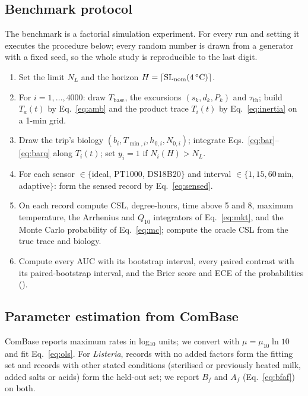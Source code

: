 \subsection{Benchmark protocol}\label{sec:protocol}
The benchmark is a factorial simulation experiment. For every run and setting it executes the procedure below; every random number is drawn from a generator with a fixed seed, so the whole study is reproducible to the last digit.

\begin{tcolorbox}[enhanced,breakable,colback=white,colframe=dgrule,boxrule=0.5pt,arc=0pt,left=5pt,right=5pt,top=3pt,bottom=3pt,fontupper=\small,title={\small\bfseries Algorithm 1\enspace Benchmark for one run and one setting},coltitle=black,colbacktitle=dgpale]
\begin{enumerate}[leftmargin=1.6em,label=\arabic*.]
\item Set the limit $N_L$ and the horizon $H=\lceil\mathrm{SL}_{\mathrm{nom}}(4\,^\circ\mathrm C)\rceil$.
\item For $i=1,\dots,4000$: draw $T_{\mathrm{base}}$, the excursions $(s_k,d_k,P_k)$ and $\tau_{\mathrm{th}}$; build $T_a(t)$ by Eq.~\eqref{eq:amb} and the product trace $T_i(t)$ by Eq.~\eqref{eq:inertia} on a 1-min grid.
\item Draw the trip's biology $(b_i,T_{\min,i},h_{0,i},N_{0,i})$; integrate Eqs.~\eqref{eq:bar}--\eqref{eq:barq} along $T_i(t)$; set $y_i=1$ if $N_i(H)>N_L$.
\item For each sensor $\in\{$ideal, PT1000, DS18B20$\}$ and interval $\in\{1,15,60$\,min, adaptive$\}$: form the sensed record by Eq.~\eqref{eq:sensed}.
\item On each record compute CSL, degree-hours, time above 5 and 8\degC, maximum temperature, the Arrhenius and $Q_{10}$ integrators of Eq.~\eqref{eq:mkt}, and the Monte Carlo probability of Eq.~\eqref{eq:mc}; compute the oracle CSL from the true trace and biology.
\item Compute every AUC with its bootstrap interval, every paired contrast with its paired-bootstrap interval, and the Brier score and ECE of the probabilities ().
\end{enumerate}
\end{tcolorbox}

\subsection{Parameter estimation from ComBase}
ComBase reports maximum rates in log$_{10}$ units; we convert with $\mu=\mu_{10}\ln10$ and fit Eq.~\eqref{eq:ols}. For \textit{Listeria}, records with no added factors form the fitting set and records with other stated conditions (sterilised or previously heated milk, added salts or acids) form the held-out set; we report $B_f$ and $A_f$ (Eq.~\eqref{eq:bfaf}) on both.

